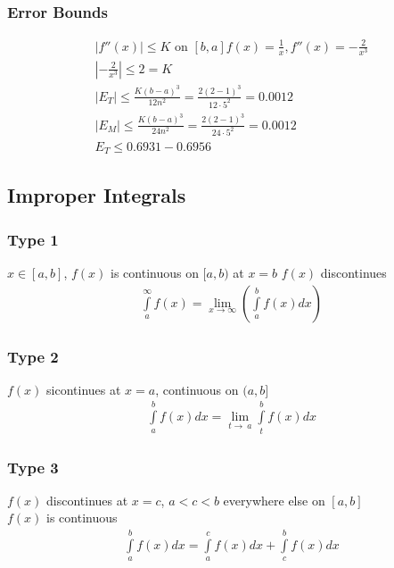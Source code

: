 \documentclass[12pt, letterpaper]{article}
\begin{document}
\subsubsection{Error Bounds}
\begin{gather*}
  |f''(x)| \leq K \text{ on } [b,a] f(x) = \frac{1}{x}, f''(x)=-\frac{2}{x^3}\\
  \left |-\frac{2}{x^3} \right | \leq 2 = K\\
  |E_T| \leq \frac{K(b-a)^3}{12n^2} = \frac{2(2-1)^3}{12 \cdot 5^2} = 0.0012\\
  |E_M| \leq \frac{K(b-a)^3}{24n^2} = \frac{2(2-1)^3}{24 \cdot 5^2} = 0.0012\\
  E_T \leq 0.6931-0.6956
\end{gather*}

\subsection{Improper Integrals}
\subsubsection{Type 1}
$x \in [a,b]$, $f(x)$ is continuous on $[a,b)$ at $x=b$ $f(x)$ discontinues
\begin{gather*}
  \int \limits _{a}^{\infty} f(x) = \lim_{x\to\infty} \left ( \int \limits _{a}^{b} f(x) dx \right )
\end{gather*}

\subsubsection{Type 2}
$f(x)$ sicontinues at $x=a$, continuous on $(a,b]$
\begin{gather*}
  \int \limits _{a}^{b} f(x)dx = \lim_{t\to\ a} \int \limits _{t}^{b} f(x) dx
\end{gather*}

\subsubsection{Type 3}
$f(x)$ discontinues at $x=c$, $a<c<b$ everywhere else on $[a,b]$\\
$f(x)$ is continuous
\begin{gather*}
  \int \limits _{a}^{b} f(x)dx = \int \limits _{a}^{c} f(x)dx + \int \limits _{c}^{b} f(x)dx
\end{gather*}
\end{document}
